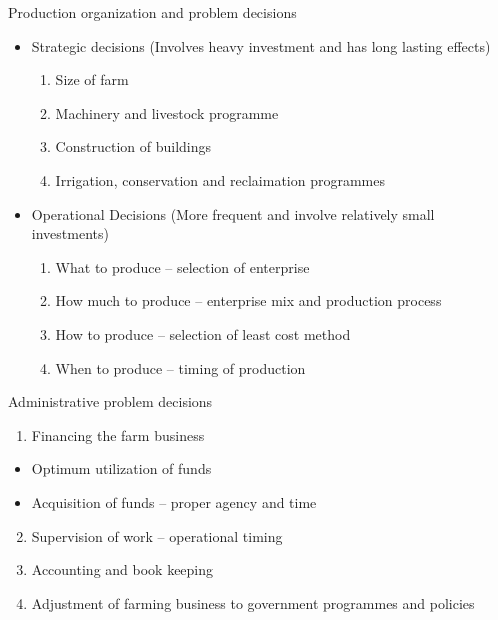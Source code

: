 \documentclass[12pt,ignorenonframetext,aspectratio=169]{beamer}
\providecommand{\tightlist}{%
  \setlength{\itemsep}{0pt}\setlength{\parskip}{0pt}}
\begin{document}
\begin{frame}{Production organization and problem decisions}
\protect\hypertarget{production-organization-and-problem-decisions}{}
\begin{block}{}
\protect\hypertarget{section-6}{}
\begin{itemize}
\tightlist
\item
  Strategic decisions (Involves heavy investment and has long lasting
  effects)

  \begin{enumerate}
  \tightlist
  \item
    Size of farm
  \item
    Machinery and livestock programme
  \item
    Construction of buildings
  \item
    Irrigation, conservation and reclaimation programmes
  \end{enumerate}
\item
  Operational Decisions (More frequent and involve relatively small
  investments)

  \begin{enumerate}
  \tightlist
  \item
    What to produce -- selection of enterprise
  \item
    How much to produce -- enterprise mix and production process
  \item
    How to produce -- selection of least cost method
  \item
    When to produce -- timing of production
  \end{enumerate}
\end{itemize}
\end{block}
\end{frame}

\begin{frame}{Administrative problem decisions}
\protect\hypertarget{administrative-problem-decisions}{}
\begin{block}{}
\protect\hypertarget{section-7}{}
\begin{enumerate}
\tightlist
\item
  Financing the farm business
\end{enumerate}

\begin{itemize}
\tightlist
\item
  Optimum utilization of funds
\item
  Acquisition of funds -- proper agency and time
\end{itemize}

\begin{enumerate}
\setcounter{enumi}{1}
\tightlist
\item
  Supervision of work -- operational timing
\item
  Accounting and book keeping
\item
  Adjustment of farming business to government programmes and policies
\end{enumerate}
\end{block}
\end{frame}
\end{document}
